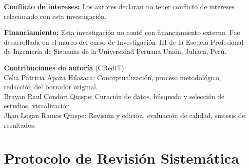 \documentclass[12pt, a4paper]{article}
\begin{document}
\noindent\textbf{Conflicto de intereses:} Los autores declaran no tener
conflicto de intereses relacionado con esta investigaci\'{o}n.

\noindent\textbf{Financiamiento:} Esta investigaci\'{o}n no cont\'{o}
con financiamiento externo. Fue desarrollada en el marco del curso de
Investigaci\'{o}n~III de la Escuela Profesional de Ingenier\'{i}a de
Sistemas de la Universidad Peruana Uni\'{o}n, Juliaca, Per\'{u}.

\noindent\textbf{Contribuciones de autor\'{i}a} (CRediT):\\
Celia Patricia Apaza Hilasaca: Conceptualizaci\'{o}n, proceso
metodol\'{o}gico, redacci\'{o}n del borrador original.\\
Brayan Raul Condori Quispe: Curaci\'{o}n de datos, b\'{u}squeda y
selecci\'{o}n de estudios, visualizaci\'{o}n.\\
Jhan Logan Ramos Quispe: Revisi\'{o}n y edici\'{o}n, evaluaci\'{o}n de
calidad, s\'{i}ntesis de resultados.

\printbibliography[title={Referencias}, heading=bibintoc]

\appendix

\section{Protocolo de Revisi\'{o}n Sistem\'{a}tica}
\end{document}
